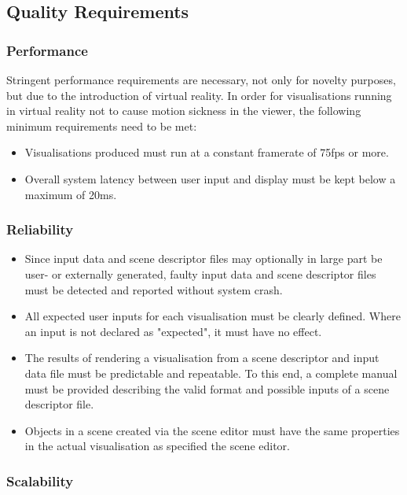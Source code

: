 \documentclass[a4paper,12pt]{article}
\begin{document}
\subsection{Quality Requirements}
	
	\subsubsection{Performance}
	
		Stringent performance requirements are necessary, not only for novelty purposes, but due to the introduction of virtual reality. In order for visualisations running in virtual reality not to cause motion sickness in the viewer, the following minimum requirements need to be met:
		
		\begin{itemize}
			\item Visualisations produced must run at a constant framerate of 75fps or more.
			\item Overall system latency between user input and display must be kept below a maximum of 20ms.
		\end{itemize}
	
	\subsubsection{Reliability}
	
		\begin{itemize}
			\item Since input data and scene descriptor files may optionally in large part be user- or externally generated, faulty input data and scene descriptor files must be detected and reported without system crash.
			\item All expected user inputs for each visualisation must be clearly defined. Where an input is not declared as "expected", it must have no effect.
			\item The results of rendering a visualisation from a scene descriptor and input data file must be predictable and repeatable. To this end, a complete manual must be provided describing the valid format and possible inputs of a scene descriptor file. 
			\item Objects in a scene created via the scene editor must have the same properties in the actual visualisation as specified the scene editor.
		\end{itemize}
		
	\subsubsection{Scalability}
	
\end{document}
